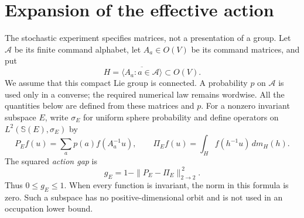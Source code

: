 \section{Expansion of the effective action}\label{sec:action41}
The stochastic experiment specifies matrices, not a presentation of a group.
Let $\mathcal A$ be its finite command alphabet, let $A_a\in O(V)$ be
its command matrices, and put
\[
 H=\overline{\langle A_a:a\in\mathcal A\rangle}\subset O(V).
\]
We assume that this compact Lie group is connected. A probability $p$ on
$\mathcal A$ is used only in a converse; the required numerical law remains
wordwise. All the quantities below are defined from these matrices and $p$.
For a nonzero invariant subspace $E$, write $\sigma_E$ for uniform sphere
probability and define operators on $L^2(\mathbb S(E),\sigma_E)$ by
\[
 P_E f(u)=\sum_a p(a)f(A_a^{-1}u),\qquad
 \Pi_E f(u)=\int_H f(h^{-1}u)\,dm_H(h).
\]
The squared \emph{action gap} is
\begin{equation}\label{eq:action-gap41}
 g_E=1-\|P_E-\Pi_E\|_{2\to2}^{\,2}.
\end{equation}
Thus $0\le g_E\le1$. When every function is invariant, the norm in this
formula is zero. Such a subspace has no positive-dimensional orbit and
is not used in an occupation lower bound.

